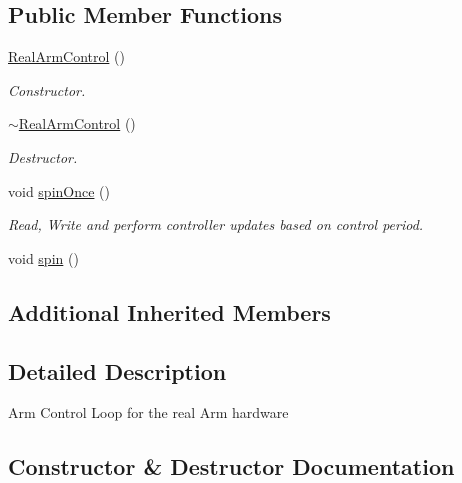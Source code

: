 \subsection*{Public Member Functions}
\begin{DoxyCompactItemize}
\item 
\hyperlink{classuwrt_1_1arm_1_1_real_arm_control_aedb0ce5a7ad8b1e8451806873544c00d}{Real\+Arm\+Control} ()
\begin{DoxyCompactList}\small\item\em Constructor. \end{DoxyCompactList}\item 
\hyperlink{classuwrt_1_1arm_1_1_real_arm_control_a1f201262f19bfae812e33d4ce47f9ba2}{$\sim$\+Real\+Arm\+Control} ()
\begin{DoxyCompactList}\small\item\em Destructor. \end{DoxyCompactList}\item 
void \hyperlink{classuwrt_1_1arm_1_1_real_arm_control_aa6b49ca2736508e70b4b135c21f1cf51}{spin\+Once} ()
\begin{DoxyCompactList}\small\item\em Read, Write and perform controller updates based on control period. \end{DoxyCompactList}\item 
void \hyperlink{classuwrt_1_1arm_1_1_real_arm_control_ac174f649dd8c5a48250e0b84b4442b5e}{spin} ()
\end{DoxyCompactItemize}
\subsection*{Additional Inherited Members}


\subsection{Detailed Description}
Arm Control Loop for the real Arm hardware 

\subsection{Constructor \& Destructor Documentation}
\mbox{\label{classuwrt_1_1arm_1_1_real_arm_control_aedb0ce5a7ad8b1e8451806873544c00d}} 
